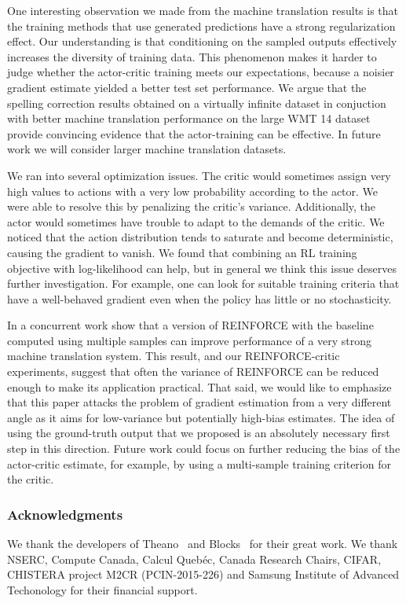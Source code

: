 \documentclass{article} \usepackage{iclr2017_conference,times}
\begin{document}
One interesting observation we made from the machine translation results is
that the training methods that use generated predictions have a strong
regularization effect. Our understanding is that conditioning on the sampled
outputs effectively increases the diversity of training data. This phenomenon
makes it harder to judge whether the actor-critic training meets our
expectations, because a noisier gradient estimate yielded a better test set
performance. We argue that the spelling correction results obtained on
a virtually infinite dataset in conjuction with better machine translation
performance on the large WMT 14 dataset provide convincing evidence that the
actor-training can be effective. In future work we will consider larger
machine translation datasets.

We ran into several optimization issues.
The critic would sometimes assign very high values to
actions with a very low probability according to the actor. We were able to
resolve this by penalizing the critic's variance. Additionally, 
the actor would sometimes have trouble to adapt to the demands of
the critic. We noticed that the action distribution tends to saturate
and become deterministic, causing the gradient to vanish. We found that
combining an RL training objective with log-likelihood can help, but in general
we think this issue deserves further investigation. For example, one can look
for suitable training criteria that have a well-behaved gradient even when the
policy has little or no stochasticity.

In a concurrent work \citet{wu2016google} show that a version of REINFORCE with
the baseline computed using multiple samples can improve performance of a very
strong machine translation system. This result, and our REINFORCE-critic
experiments, suggest that often the variance of REINFORCE can be reduced
enough to make its application practical. That said, we would like to emphasize
that this paper attacks the problem of gradient estimation from a very
different angle as it aims for low-variance but potentially high-bias
estimates. The idea of using the ground-truth output that we proposed is an
absolutely necessary first step in this direction. Future work could focus on
further reducing the bias of the actor-critic estimate, for example, by using a
multi-sample training criterion for the critic.




\subsubsection*{Acknowledgments}
We thank the developers of Theano~\citep{team2016theano} and Blocks~\citep{blocksfuel} for
their great work. We thank NSERC, Compute Canada, Calcul Queb\'ec, Canada Research
Chairs, CIFAR, CHISTERA project M2CR (PCIN-2015-226) and Samsung Institute of Advanced Techonology for their financial support.
\end{document}
